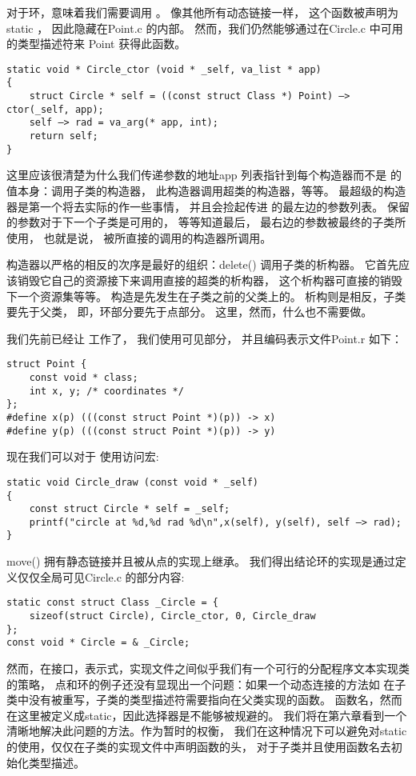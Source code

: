 对于环，意味着我们需要调用 。
像其他所有动态链接一样，
这个函数被声明为static ，
因此隐藏在Point.c 的内部。
然而，我们仍然能够通过在Circle.c 中可用的类型描述符来 Point 获得此函数。
\begin{lstlisting}
static void * Circle_ctor (void * _self, va_list * app)
{
    struct Circle * self = ((const struct Class *) Point) —> ctor(_self, app);
    self —> rad = va_arg(* app, int);
    return self;
}
\end{lstlisting}

这里应该很清楚为什么我们传递参数的地址app 列表指针到每个构造器而不是
 的值本身：调用子类的构造器，
此构造器调用超类的构造器，等等。
最超级的构造器是第一个将去实际的作一些事情，
并且会捡起传进 的最左边的参数列表。
保留的参数对于下一个子类是可用的，
等等知道最后，
最右边的参数被最终的子类所使用，
也就是说，
被所直接的调用的构造器所调用。

构造器以严格的相反的次序是最好的组织：delete() 调用子类的析构器。
它首先应该销毁它自己的资源接下来调用直接的超类的析构器，
这个析构器可直接的销毁下一个资源集等等。
构造是先发生在子类之前的父类上的。
析构则是相反，子类要先于父类，
即，环部分要先于点部分。
这里，然而，什么也不需要做。

我们先前已经让 工作了，
我们使用可见部分，
并且编码表示文件Point.r 如下：
\begin{lstlisting}
struct Point {
    const void * class;
    int x, y; /* coordinates */
};
#define x(p) (((const struct Point *)(p)) -> x)
#define y(p) (((const struct Point *)(p)) -> y)
\end{lstlisting}

现在我们可以对于 使用访问宏:
\begin{lstlisting}
static void Circle_draw (const void * _self)
{
    const struct Circle * self = _self;
    printf("circle at %d,%d rad %d\n",x(self), y(self), self —> rad);
}
\end{lstlisting}

move() 拥有静态链接并且被从点的实现上继承。
我们得出结论环的实现是通过定义仅仅全局可见Circle.c 的部分内容:
\begin{lstlisting}
static const struct Class _Circle = {
    sizeof(struct Circle), Circle_ctor, 0, Circle_draw
};
const void * Circle = & _Circle;
\end{lstlisting}

然而，在接口，表示式，实现文件之间似乎我们有一个可行的分配程序文本实现类的策略，
点和环的例子还没有显现出一个问题：如果一个动态连接的方法如 
在子类中没有被重写，子类的类型描述符需要指向在父类实现的函数。
函数名，然而在这里被定义成static，因此选择器是不能够被规避的。
我们将在第六章看到一个清晰地解决此问题的方法。作为暂时的权衡，
我们在这种情况下可以避免对static 的使用，仅仅在子类的实现文件中声明函数的头，
对于子类并且使用函数名去初始化类型描述。


